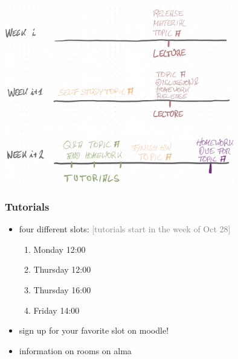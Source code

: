 \documentclass[fleqn,10pt,serif,xcolor=svgnames,xcolor=table,aspectratio=169,handout]{beamer}
\newcommand{\mycom}[1]{\hfill {\mygray{[#1]}}}
\newcommand{\mygray}[1]{\textcolor{gray}{#1}}
\begin{document}
\begin{frame}

  \begin{center}
    \includegraphics[width=0.75\textwidth]{00-introduction-pics/timing-logic.png}
  \end{center}

\end{frame}

\begin{frame}
  \frametitle{Tutorials}
  \begin{itemize}
    \item four different slots: \hfill \mycom{tutorials start in the week of Oct 28}
    \begin{enumerate}
      \item {}          Monday 12:00
      \item {}            Thursday 12:00
      \item {}           Thursday 16:00
      \item {}           Friday 14:00
    \end{enumerate}
    \item sign up for your favorite slot on moodle!
    \item information on rooms on alma
  \end{itemize}
\end{frame}
\end{document}
